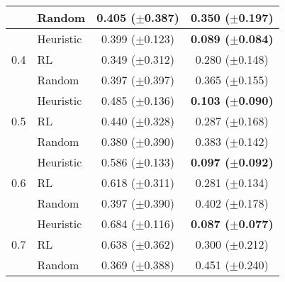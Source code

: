 \begin{table}[!h]
\begin{tabular}{cl|cc|cc}
 & Random &\multicolumn{2}{c}{ \cellcolor[HTML]{e27d63} \color{white} {0.405} ($\pm{}$0.387) } &\multicolumn{2}{c}{ \cellcolor[HTML]{f3a380} \color{black} {0.350} ($\pm{}$0.197) }  \\
\midrule
\multirow[c]{3}{*}{0.4} & Heuristic &\multicolumn{2}{c}{ \cellcolor[HTML]{e58368} \color{black} {0.399} ($\pm{}$0.123) } &\multicolumn{2}{c}{ \cellcolor[HTML]{dfecf2} \color{black} \textbf{{0.089} ($\pm{}$0.084)} }  \\
 & RL &\multicolumn{2}{c}{ \cellcolor[HTML]{f4a683} \color{black} {0.349} ($\pm{}$0.312) } &\multicolumn{2}{c}{ \cellcolor[HTML]{facab1} \color{black} {0.280} ($\pm{}$0.148) }  \\
 & Random &\multicolumn{2}{c}{ \cellcolor[HTML]{e58368} \color{black} {0.397} ($\pm{}$0.397) } &\multicolumn{2}{c}{ \cellcolor[HTML]{ee9878} \color{black} {0.365} ($\pm{}$0.155) }  \\
\midrule
\multirow[c]{3}{*}{0.5} & Heuristic &\multicolumn{2}{c}{ \cellcolor[HTML]{c94641} \color{white} {0.485} ($\pm{}$0.136) } &\multicolumn{2}{c}{ \cellcolor[HTML]{e4eef3} \color{black} \textbf{{0.103} ($\pm{}$0.090)} }  \\
 & RL &\multicolumn{2}{c}{ \cellcolor[HTML]{d86551} \color{white} {0.440} ($\pm{}$0.328) } &\multicolumn{2}{c}{ \cellcolor[HTML]{f9c5ab} \color{black} {0.287} ($\pm{}$0.168) }  \\
 & Random &\multicolumn{2}{c}{ \cellcolor[HTML]{eb9072} \color{black} {0.380} ($\pm{}$0.390) } &\multicolumn{2}{c}{ \cellcolor[HTML]{ea8e70} \color{black} {0.383} ($\pm{}$0.142) }  \\
\midrule
\multirow[c]{3}{*}{0.6} & Heuristic &\multicolumn{2}{c}{ \cellcolor[HTML]{960f26} \color{white} {0.586} ($\pm{}$0.133) } &\multicolumn{2}{c}{ \cellcolor[HTML]{e2edf3} \color{black} \textbf{{0.097} ($\pm{}$0.092)} }  \\
 & RL &\multicolumn{2}{c}{ \cellcolor[HTML]{7e0722} \color{white} {0.618} ($\pm{}$0.311) } &\multicolumn{2}{c}{ \cellcolor[HTML]{facab1} \color{black} {0.281} ($\pm{}$0.134) }  \\
 & Random &\multicolumn{2}{c}{ \cellcolor[HTML]{e58368} \color{black} {0.397} ($\pm{}$0.390) } &\multicolumn{2}{c}{ \cellcolor[HTML]{e48065} \color{white} {0.402} ($\pm{}$0.178) }  \\
\midrule
\multirow[c]{3}{*}{0.7} & Heuristic &\multicolumn{2}{c}{ \cellcolor[HTML]{67001f} \color{white} {0.684} ($\pm{}$0.116) } &\multicolumn{2}{c}{ \cellcolor[HTML]{deebf2} \color{black} \textbf{{0.087} ($\pm{}$0.077)} }  \\
 & RL &\multicolumn{2}{c}{ \cellcolor[HTML]{6f0220} \color{white} {0.638} ($\pm{}$0.362) } &\multicolumn{2}{c}{ \cellcolor[HTML]{f8bfa3} \color{black} {0.300} ($\pm{}$0.212) }  \\
 & Random &\multicolumn{2}{c}{ \cellcolor[HTML]{ee9878} \color{black} {0.369} ($\pm{}$0.388) } &\multicolumn{2}{c}{ \cellcolor[HTML]{d6604d} \color{white} {0.451} ($\pm{}$0.240) }  \\
\bottomrule
\end{tabular}
\end{table}